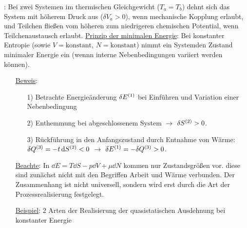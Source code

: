 : Bei zwei Systemen im thermischen Gleichgewicht ($T_a = T_b$) dehnt sich das System mit höherem Druck aus ($\delta V_a >0$), wenn mechanische Kopplung erlaubt, und Teilchen fließen vom höheren zum niedrigeren chemischen Potential, wenn Teilchenaustausch erlaubt.
\uline{Prinzip der minimalen Energie}\label{minEnergie}: Bei konstanter Entropie (sowie $V=\text{konstant}$, $N=\text{konstant}$) nimmt ein Systemden Zustand minimaler Energie ein (wennn interne Nebenbedingungen variiert werden können).

\begin{itemize}[align=left]
  \item[\uline{Beweis}:] \begin{itemize}[align=left]
    \item[1)] Betrachte Energieänderung $\delta E^{\left( 1 \right)}$ bei Einführen und Variation einer Nebenbedingung\\ 
    \item[2)] Enthemmung bei abgeschlossenem System $\rightarrow$ $\delta S^{\left( 2 \right)}>0$.
    \item[3)] Rückführung in den Anfangszustand durch Entnahme von Wärme: $\delta Q^{\left( 3 \right)}=-t\,\text d{S}^{\left( 2 \right)} < 0$ $\rightarrow$ $\delta E^{\left( 1 \right)} = -\delta Q^{\left( 3 \right)} > 0$.
\end{itemize}
  \item[\uline{Beachte}:] In $\dd{E} = T \dd{S} - p \dd{V} + \mu \dd{N}$ kommen nur Zustandsgrößen vor. diese sind zunächst nicht mit den Begriffen Arbeit und Wärme verbunden. Der Zusammenhang ist nicht universell, sondern wird erst durch die Art der Prozessrealisierung festgelegt.
  \item[\uline{Beispiel}:] $2$ Arten der Realisierung der quasistatischen Ausdehnung bei konstanter Energie
\end{itemize}


